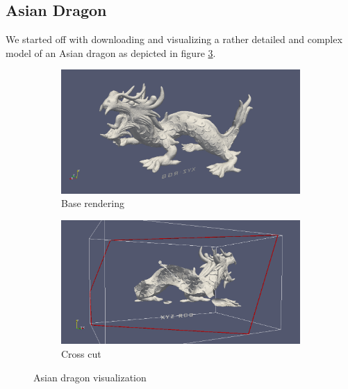 \documentclass{article}
\begin{document}
\subsection{Asian Dragon}
We started off with downloading and visualizing a rather detailed and complex model of an Asian dragon as depicted in figure \ref{fig:7}.
\begin{figure}
	\centering
	\begin{subfigure}[h]{0.4\textwidth}
		\includegraphics[width=\textwidth]{dragon.png}
		\caption{Base rendering}
		\label{fig:drake}
	\end{subfigure}
	\begin{subfigure}[h]{0.4\textwidth}
		\includegraphics[width=\textwidth]{drugon-cut.png}
		\caption{Cross cut}
		\label{fig:drakecut}
	\end{subfigure}
	\caption{Asian dragon visualization}\label{fig:7}
\end{figure}
\end{document}
